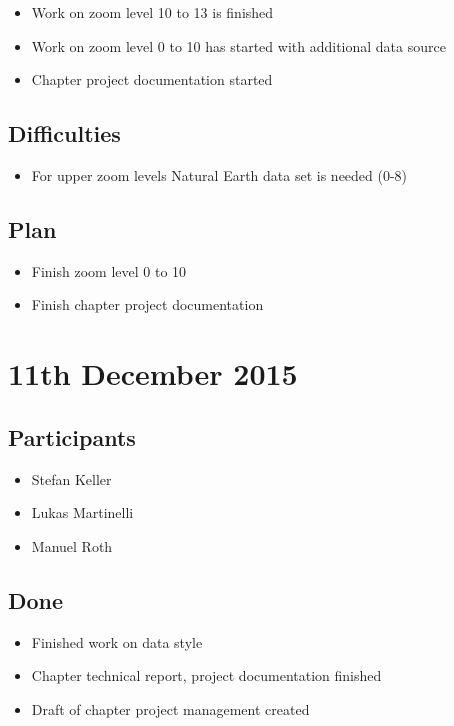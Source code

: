 \begin{itemize}
  \item Work on zoom level 10 to 13 is finished
  \item Work on zoom level 0 to 10 has started with additional data source
  \item Chapter project documentation started
\end{itemize}

\subsection*{Difficulties}

\begin{itemize}
  \item For upper zoom levels Natural Earth data set is needed (0-8)
\end{itemize}

\subsection*{Plan}

\begin{itemize}
  \item Finish zoom level 0 to 10
  \item Finish chapter project documentation
\end{itemize}

\section*{11th December 2015}

\subsection*{Participants}

\begin{itemize}
  \item Stefan Keller
  \item Lukas Martinelli
  \item Manuel Roth
\end{itemize}

\subsection*{Done}

\begin{itemize}
  \item Finished work on data style
  \item Chapter technical report, project documentation finished
  \item Draft of chapter project management created
\end{itemize}

